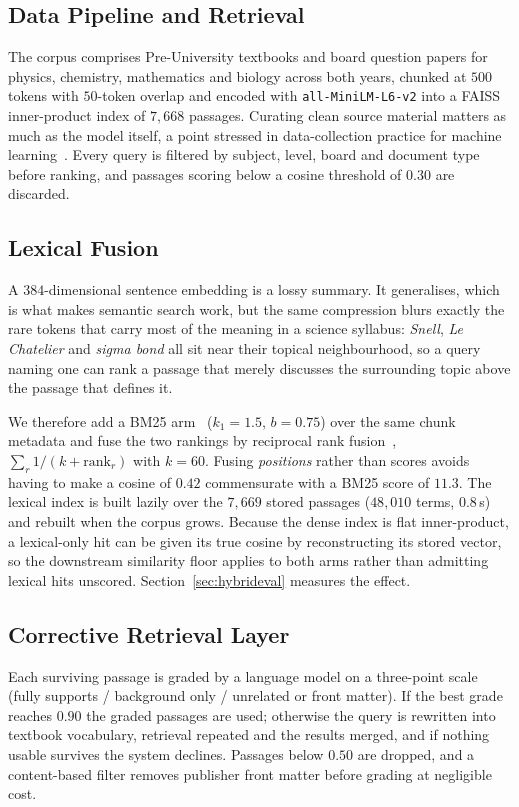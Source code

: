 \documentclass[conference]{IEEEtran}
\begin{document}
\subsection{Data Pipeline and Retrieval}
The corpus comprises Pre-University textbooks and board question papers for
physics, chemistry, mathematics and biology across both years, chunked at $500$
tokens with $50$-token overlap and encoded with
\texttt{all-MiniLM-L6-v2} into a FAISS inner-product index of
$7{,}668$ passages. Curating clean source material matters as much as the model
itself, a point stressed in data-collection practice for machine
learning~\cite{roh2021}. Every query is filtered by subject, level, board and
document type before ranking, and passages scoring below a cosine threshold of
$0.30$ are discarded.

\subsection{Lexical Fusion}
\label{sec:hybrid}
A $384$-dimensional sentence embedding is a lossy summary. It generalises, which
is what makes semantic search work, but the same compression blurs exactly the
rare tokens that carry most of the meaning in a science syllabus: \emph{Snell},
\emph{Le Chatelier} and \emph{sigma bond} all sit near their topical
neighbourhood, so a query naming one can rank a passage that merely discusses
the surrounding topic above the passage that defines it.

We therefore add a BM25 arm~\cite{robertson2009} ($k_1=1.5$, $b=0.75$) over the
same chunk metadata and fuse the two rankings by reciprocal rank
fusion~\cite{cormack2009}, $\sum_r 1/(k + \text{rank}_r)$ with $k=60$. Fusing \emph{positions} rather than scores avoids having to make a
cosine of $0.42$ commensurate with a BM25 score of $11.3$. The lexical index is
built lazily over the $7{,}669$ stored passages ($48{,}010$ terms, $0.8$\,s) and
rebuilt when the corpus grows. Because the dense index is flat inner-product,
a lexical-only hit can be given its true cosine by reconstructing its stored
vector, so the downstream similarity floor applies to both arms rather than
admitting lexical hits unscored. Section~\ref{sec:hybrideval} measures the
effect.

\subsection{Corrective Retrieval Layer}
\label{sec:crag}
Each surviving passage is graded by a language model on a three-point scale
(fully supports / background only / unrelated or front matter). If the best
grade reaches $0.90$ the graded passages are used; otherwise the query is
rewritten into textbook vocabulary, retrieval repeated and the results merged,
and if nothing usable survives the system declines. Passages below $0.50$ are
dropped, and a content-based filter removes publisher front matter before
grading at negligible cost.
\end{document}
